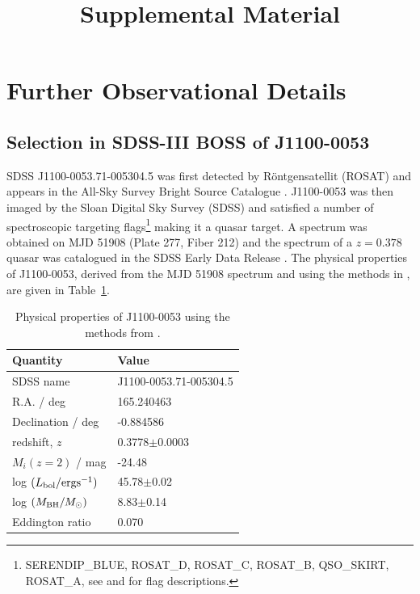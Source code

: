 \documentclass[11pt,a4paper]{article}
\begin{document}
   \title{Supplemental Material}
\maketitle

\section*{Further Observational Details}

\subsection*{Selection in SDSS-III BOSS of J1100-0053}
SDSS J1100-0053.71-005304.5 was first detected by R\"{o}ntgensatellit (ROSAT) and appears in the All-Sky Survey Bright Source Catalogue \citep[RASS-BSC; ][]{Appenzeller1998, Voges1999}.  J1100-0053 was then imaged by the Sloan Digital Sky Survey (SDSS) and satisfied a number of spectroscopic targeting flags\footnote{SERENDIP\_BLUE, ROSAT\_D, ROSAT\_C, ROSAT\_B, QSO\_SKIRT, ROSAT\_A, see \citet{EDR} and \citet{Richards2002} for flag descriptions.}  making it a quasar target. A spectrum was obtained  on MJD 51908 (Plate 277, Fiber 212) and the spectrum of a $z=0.378$ quasar was catalogued in the SDSS Early Data Release \citep{Stoughton2002, Schneider2002}. The physical properties of J1100-0053, derived from the MJD 51908 spectrum and using the methods in \citet{Shen2011}, are given in Table~\ref{tab:Shen_props}.

\begin{table}[]
    \centering
    \begin{tabular}{l l }
      \hline \hline 
      Quantity                                         &  Value \\
      \hline 
      SDSS name                                     &   J1100-0053.71-005304.5 \\
      R.A. / deg                &  165.240463 \\
      Declination / deg    &   -0.884586 \\ 
      redshift, $z$                                    &   0.3778$\pm$0.0003  \\
      $M_{i}(z=2)$  / mag                          &   -24.48  \\
      log $(L_{\rm bol} / {\rm erg s}^{-1}) $  &  45.78$\pm$0.02 \\
      log $(M_{\rm BH} / M_{\odot})  $           &  8.83$\pm$0.14 \\
      Eddington ratio                                &        0.070 \\
      \hline \hline 
    \end{tabular}
    \caption{Physical properties of J1100-0053 using the methods from 
      \citet{Shen2011}.} 
    \label{tab:Shen_props}
\end{table}
\end{document}

